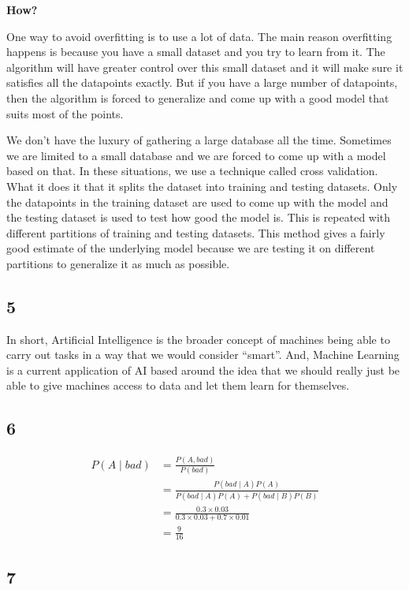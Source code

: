 \documentclass[letterpaper, 10 pt, conference]{ieeeconf}
\begin{document}
\textbf{How?}

One way to avoid overfitting is to use a lot of data. The main reason overfitting happens is because you have a small dataset and you try to learn from it. The algorithm will have greater control over this small dataset and it will make sure it satisfies all the datapoints exactly. But if you have a large number of datapoints, then the algorithm is forced to generalize and come up with a good model that suits most of the points.

We don’t have the luxury of gathering a large database all the time. Sometimes we are limited to a small database and we are forced to come up with a model based on that. In these situations, we use a technique called cross validation. What it does it that it splits the dataset into training and testing datasets. Only the datapoints in the training dataset are used to come up with the model and the testing dataset is used to test how good the model is. This is repeated with different partitions of training and testing datasets. This method gives a fairly good estimate of the underlying model because we are testing it on different partitions to generalize it as much as possible.

\subsection*{5}

In short, Artificial Intelligence is the broader concept of machines being able to carry out tasks in a way that we would consider “smart”. And, Machine Learning is a current application of AI based around the idea that we should really just be able to give machines access to data and let them learn for themselves.


\subsection*{6}

\begin{align*}
    P(A \mid bad) & = \frac{P(A,bad)}{P(bad)} \\
                  & = \frac{P(bad \mid A)P(A)}{P(bad \mid A)P(A)+P(bad \mid B)P(B)}\\
                  & = \frac{0.3 \times 0.03}{0.3 \times 0.03 + 0.7 \times 0.01} \\
                  & = \frac{9}{16}
\end{align*}


\subsection*{7}
\end{document}
